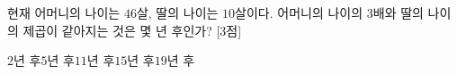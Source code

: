 현재 어머니의 나이는 $46$살, 딸의 나이는 $10$살이다. 어머니의 나이의 $3$배와 딸의 나이의 제곱이 같아지는 것은 몇 년 후인가? \mbox{[3점]}
\begin{choices32}{$2$년 후}{$5$년 후}{$11$년 후}{$15$년 후}{$19$년 후}\end{choices32}
